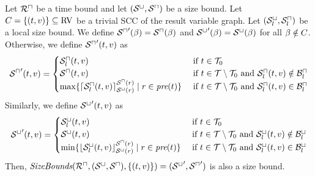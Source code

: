 \begin{theorem}
  Let ${\mathcal{R}^\sqcap}$ be a time bound and let ${({\mathcal{S}^\sqcup}, {\mathcal{S}^\sqcap})}$ be a size bound.
  Let $C = \lbrace (t,v) \rbrace \subseteq \text{RV}$ be a trivial SCC of the result variable graph.
  Let ${({\mathcal{S}^\sqcup_l}, {\mathcal{S}^\sqcap_l})}$ be a local size bound.
  We define ${\mathcal{S}^\sqcap}'(\beta) = {\mathcal{S}^\sqcap}(\beta)$ and ${\mathcal{S}^\sqcup}'(\beta) = {\mathcal{S}^\sqcup}(\beta)$ for all $\beta \notin C$.
  Otherwise, we define ${\mathcal{S}^\sqcap}'(t,v)$ as
  \[ {\mathcal{S}^\sqcap}'(t,v) =
  \begin{cases}
    {\mathcal{S}^\sqcap_l}(t, v) & \text{ if } t \in \mathcal{T}_0 \\
    {\mathcal{S}^\sqcap}(t, v) & \text{ if } t \in \mathcal{T} \setminus \mathcal{T}_0 \text{ and } {\mathcal{S}^\sqcap_l}(t,v) \notin \mathcal{B}^\sqcap_l \\
    \max \lbrace  \lceil {\mathcal{S}^\sqcap_l}(t,v) \rceil^{{\mathcal{S}^\sqcap}(r)}_{{\mathcal{S}^\sqcup}(r)} \mid r \in \emph{pre}(t) \rbrace & \text{ if } t \in \mathcal{T} \setminus \mathcal{T}_0 \text{ and } {\mathcal{S}^\sqcap_l}(t,v) \in \mathcal{B}^\sqcap_l \\
  \end{cases}
  \]
  Similarly, we define ${\mathcal{S}^\sqcup}'(t,v)$ as
  \[ {\mathcal{S}^\sqcup}'(t,v) =
  \begin{cases}
    {\mathcal{S}^\sqcup_l}(t, v) & \text{ if } t \in \mathcal{T}_0 \\
    {\mathcal{S}^\sqcup}(t, v) & \text{ if } t \in \mathcal{T} \setminus \mathcal{T}_0 \text{ and } {\mathcal{S}^\sqcup_l}(t,v) \notin \mathcal{B}^\sqcup_l \\
    \min \lbrace  \lfloor {\mathcal{S}^\sqcup_l}(t,v) \rfloor^{{\mathcal{S}^\sqcap}(r)}_{{\mathcal{S}^\sqcup}(r)} \mid r \in \emph{pre}(t) \rbrace & \text{ if } t \in \mathcal{T} \setminus \mathcal{T}_0 \text{ and } {\mathcal{S}^\sqcup_l}(t,v) \in \mathcal{B}^\sqcup_l \\
  \end{cases}
  \]
  Then, $\emph{SizeBounds}({\mathcal{R}^\sqcap}, {({\mathcal{S}^\sqcup}, {\mathcal{S}^\sqcap})}, \lbrace (t,v) \rbrace) = ({\mathcal{S}^\sqcup}', {\mathcal{S}^\sqcap}')$ is also a size bound.
\end{theorem}
